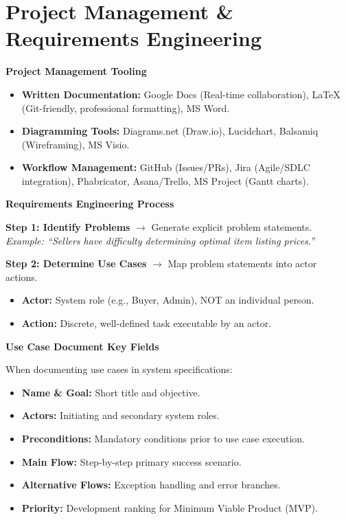 \documentclass[8pt, a4paper]{article}
\begin{document}
\section{Project Management \& Requirements Engineering}

\begin{conceptbox}
\textbf{Project Management Tooling}
\begin{itemize}
  \item \textbf{Written Documentation:} Google Docs (Real-time collaboration), \LaTeX{} (Git-friendly, professional formatting), MS Word.
  \item \textbf{Diagramming Tools:} Diagrams.net (Draw.io), Lucidchart, Balsamiq (Wireframing), MS Visio.
  \item \textbf{Workflow Management:} GitHub (Issues/PRs), Jira (Agile/SDLC integration), Phabricator, Asana/Trello, MS Project (Gantt charts).
\end{itemize}
\end{conceptbox}

\begin{conceptbox}
\textbf{Requirements Engineering Process}

\medskip
\textbf{Step 1: Identify Problems} $\to$ Generate explicit problem statements.\\
\textit{Example: ``Sellers have difficulty determining optimal item listing prices.''}

\medskip
\textbf{Step 2: Determine Use Cases} $\to$ Map problem statements into actor actions.
\begin{itemize}
  \item \textbf{Actor:} System role (e.g., Buyer, Admin), NOT an individual person.
  \item \textbf{Action:} Discrete, well-defined task executable by an actor.
\end{itemize}
\end{conceptbox}

\begin{conceptbox}
\textbf{Use Case Document Key Fields}

When documenting use cases in system specifications:
\begin{itemize}
  \item \textbf{Name \& Goal:} Short title and objective.
  \item \textbf{Actors:} Initiating and secondary system roles.
  \item \textbf{Preconditions:} Mandatory conditions prior to use case execution.
  \item \textbf{Main Flow:} Step-by-step primary success scenario.
  \item \textbf{Alternative Flows:} Exception handling and error branches.
  \item \textbf{Priority:} Development ranking for Minimum Viable Product (MVP).
\end{itemize}
\end{conceptbox}
\end{document}
